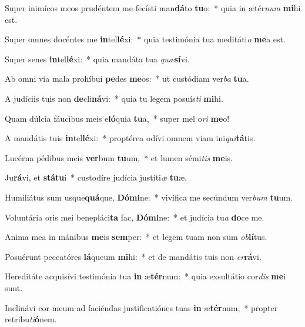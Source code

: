 \item Super inimícos meos prudéntem me fecísti man\textbf{dá}to \textbf{tu}o:~* quia in ætér\textit{num} \textbf{mi}hi est.
\item Super omnes docéntes me \textbf{in}tel\textbf{lé}xi:~* quia testimónia tua meditáti\textit{o} \textbf{me}a est.
\item Super senes \textbf{in}tel\textbf{lé}xi:~* quia mandáta tua \textit{quæ}\textbf{sí}vi.
\item Ab omni via mala prohíbui \textbf{pe}des \textbf{me}os:~* ut custódiam ver\textit{ba} \textbf{tu}a.
\item A judíciis tuis non \textbf{de}cli\textbf{ná}vi:~* quia tu legem posuís\textit{ti} \textbf{mi}hi.
\item Quam dúlcia fáucibus meis e\textbf{ló}quia \textbf{tu}a,~* super mel o\textit{ri} \textbf{me}o!
\item A mandátis tuis \textbf{in}tel\textbf{lé}xi:~* proptérea odívi omnem viam ini\textit{qui}\textbf{tá}tis.
\item Lucérna pédibus meis \textbf{ver}bum \textbf{tu}um,~* et lumen sémi\textit{tis} \textbf{me}is.
\item Ju\textbf{rá}vi, et \textbf{stá}\textbf{tu}i~* custodíre judícia justíti\textit{æ} \textbf{tu}æ.
\item Humiliátus sum usque\textbf{quá}que, \textbf{Dó}\textbf{mi}ne:~* vivífica me secúndum ver\textit{bum} \textbf{tu}um.
\item Voluntária oris mei benepláci\textbf{ta} fac, \textbf{Dó}\textbf{mi}ne:~* et judícia tu\textit{a} \textbf{do}ce me.
\item Anima mea in mánibus \textbf{me}is \textbf{sem}per:~* et legem tuam non sum \textit{ob}\textbf{lí}tus.
\item Posuérunt peccatóres \textbf{lá}queum \textbf{mi}hi:~* et de mandátis tuis non \textit{er}\textbf{rá}vi.
\item Hereditáte acquisívi testimónia tua \textbf{in} æ\textbf{tér}num:~* quia exsultátio cor\textit{dis} \textbf{me}i sunt.
\item Inclinávi cor meum ad faciéndas justificatiónes tuas \textbf{in} æ\textbf{tér}num,~* propter retribu\textit{ti}\textbf{ó}nem.
